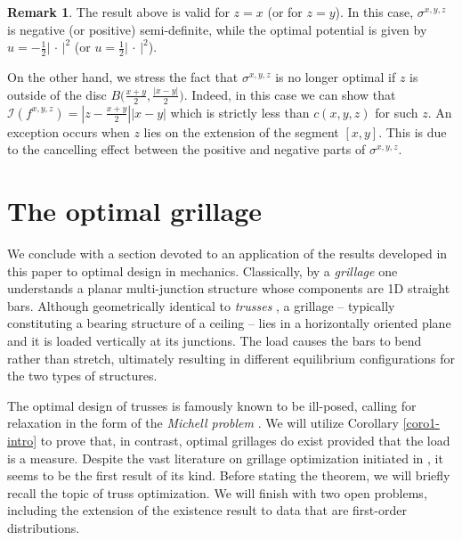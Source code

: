 \documentclass[11pt,letterpaper,reqno]{amsart}
\theoremstyle{definition}
\newtheorem{remark}[theorem]{Remark}
\numberwithin{equation}{section}
\newcommand{\argu}{{\,\cdot\,}}
\newcommand{\abs}[1]{{\left \lvert #1 \right \rvert}}
\begin{document}
{\begin{remark}
	The result above  is valid for $z =x$ (or for $z = y$).  In this case, 
	  $\sigma^{x,y,z}$ is negative (or positive) semi-definite, while the optimal potential is given by $u = - \frac{1}{2} \abs{\argu}^2$ (or $u = \frac{1}{2} \abs{\argu}^2$).
	  
	On the other hand, we stress the fact that $\sigma^{x,y,z}$ is no longer optimal if $z$ is outside of the disc $B\big(\frac{x+y}{2}, \frac{|x-y|}{2}\big)$. Indeed, in this case we can show that $\mathcal{I}(f^{x,y,z}) =  |z-\frac{x+y}{2} | \abs{x-y}$ which is strictly less than $c(x,y,z)$ for such $z$. An exception occurs when $z$ lies on the extension of the segment $[x,y]$. This is due to the cancelling effect between the positive and negative parts of $\sigma^{x,y,z}$.

\end{remark}




\section{The optimal grillage}\label{meca}

We conclude with a section devoted to an application of the results developed in this paper to optimal design in mechanics. Classically, by a \textit{grillage} one understands a planar multi-junction structure whose components are 1D straight bars. Although geometrically identical to \textit{trusses} \cite{bouchitte2008}, a grillage -- typically constituting a bearing structure of a ceiling -- lies in a horizontally oriented plane  and  it is loaded vertically at its junctions. The load causes the bars to bend rather than stretch, ultimately resulting in different equilibrium configurations for the two types of structures.

The optimal design of trusses is famously known to be ill-posed, calling for relaxation in the form of the \textit{Michell problem}  \cite{bouchitte2008,lewinski2019}. We will utilize Corollary \ref{coro1-intro} to prove that, in contrast, optimal grillages do exist provided that the load is a measure.
Despite the vast literature on grillage optimization initiated in  \cite{rozvany1972a}, it seems to be the first result of its kind. Before stating the theorem, we will briefly recall the topic of truss optimization. We will finish with two open problems, including the extension of the existence result to data that are  first-order distributions.

}
\end{document}
